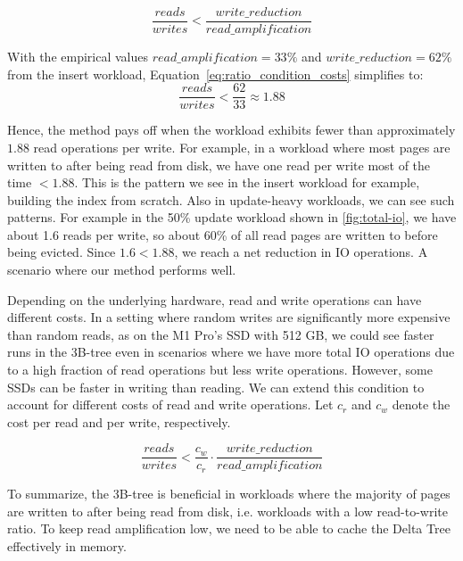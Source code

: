 \begin{equation}
\frac{reads}{writes} < \frac{write\_reduction}{read\_amplification}
\label{eq:ratio_condition}
\end{equation}

With the empirical values $read\_amplification = 33\%$ and $write\_reduction = 62\%$ from the insert workload,  
Equation~\ref{eq:ratio_condition_costs} simplifies to:
\begin{equation}
\frac{reads}{writes} < \frac{62}{33} \approx 1.88
\end{equation}

Hence, the method pays off when the workload exhibits fewer than approximately $1.88$ read operations per write.
For example, in a workload where most pages are written to after being read from disk, we have one read per write most of the time $< 1.88$.
This is the pattern we see in the insert workload for example, building the index from scratch.
Also in update-heavy workloads, we can see such patterns.
For example in the 50\% update workload shown in \autoref{fig:total-io}, we have about 1.6 reads per write, so about 60\% of all read pages are written to before being evicted.
Since $1.6 < 1.88$, we reach a net reduction in \ac{IO} operations.
A scenario where our method performs well. 

Depending on the underlying hardware, read and write operations can have different costs.
In a setting where random writes are significantly more expensive than random reads, as on the M1 Pro's SSD with 512 GB, we could see faster runs in the 3B-tree even in scenarios where we have more total \ac{IO} operations due to a high fraction of read operations but less write operations.
However, some SSDs can be faster in writing than reading.
We can extend this condition to account for different costs of read and write operations.
Let $c_r$ and $c_w$ denote the cost per read and per write, respectively.  

\begin{equation}
\frac{reads}{writes} < \frac{c_w}{c_r} \cdot
\frac{write\_reduction}{read\_amplification}
\label{eq:ratio_condition_costs}
\end{equation}

To summarize, the 3B-tree is beneficial in workloads where the majority of pages are written to after being read from disk, i.e. workloads with a low read-to-write ratio.
To keep read amplification low, we need to be able to cache the Delta Tree effectively in memory.


